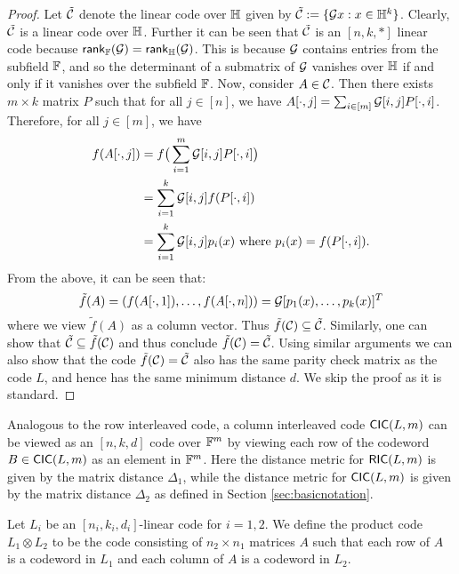 \begin{proof}
Let $\tilde{\mathcal{C}}$ denote the linear code over $\mathbb{H}$ given by $\tilde{\mathcal{C}} :=
\{\mathcal{G}x: x\in \mathbb{H}^k\}$. Clearly, $\tilde{\mathcal{C}}$ is a linear code over $\mathbb{H}$.
Further it can be seen that $\tilde{\mathcal{C}}$ is an $[n,k,\ast]$ linear code because
$\mathsf{rank}_{\mathbb{F}}(\mathcal{G})=\mathsf{rank}_{\mathbb{H}}(\mathcal{G})$. This is because $\mathcal{G}$
contains entries from the subfield $\mathbb{F}$, and so the determinant of a submatrix of $\mathcal{G}$
vanishes over $\mathbb{H}$ if and only if it vanishes over the subfield $\mathbb{F}$. Now,
consider $A\in \mathcal{C}$. Then there exists $m\times k$ matrix $P$ such that for all $j\in [n]$, 
we have $A[\cdot,j]=\sum_{i\in [m]}\mathcal{G}[i,j]P[\cdot,i]$. Therefore, for all
$j\in [m]$,  we have
\begin{align*}
f(A[\cdot,j]) &= f\big(\sum_{i=1}^m \mathcal{G}[i,j]P[\cdot,i]\big) \\
	&= \sum_{i=1}^k \mathcal{G}[i,j]f(P[\cdot,i]) \\
	&= \sum_{i=1}^k \mathcal{G}[i,j]p_i(x) \text{ where } p_i(x)=f(P[\cdot,i]).
\end{align*}
From the above, it can be seen that:
\[ \tilde{f}(A)=(f(A[\cdot,1]),\ldots,f(A[\cdot,n]))=\mathcal{G}
[p_1(x),\ldots,p_k(x)]^T \]
 where we view $\tilde{f}(A)$ as a column vector. Thus
$\tilde{f}(\mathcal{C})\subseteq \tilde{\mathcal{C}}$. Similarly, one can show that
$\tilde{\mathcal{C}}\subseteq \tilde{f}(\mathcal{C})$ and thus conclude
$\tilde{f}(\mathcal{C})=\tilde{\mathcal{C}}$. Using similar arguments we can also show
that the code $\tilde{f}(\mathcal{C})=\tilde{\mathcal{C}}$ also has the same parity check
matrix as the code $L$, and hence has the same minimum distance $d$. We skip the
proof as it is standard. 
\end{proof}

Analogous to the row interleaved code, a column interleaved code $\mathsf{CIC}(L,m)$ 
can be viewed as an $[n,k,d]$ code over $\mathbb{F}^m$ by viewing each row of the
codeword $B\in \mathsf{CIC}(L,m)$ as an element in $\mathbb{F}^m$. Here the distance metric
for $\mathsf{RIC}(L,m)$ is given by the matrix distance $\Delta_1$, while the distance
metric for $\mathsf{CIC}(L,m)$ is given by the matrix distance $\Delta_2$ as defined in
Section \ref{sec:basicnotation}.  
 
\begin{definition}\label{defn:productcode}
Let $L_i$ be an $[n_i,k_i,d_i]$-linear code for $i=1,2$. We define the product
code $L_1\otimes L_2$ to be the code consisting of $n_2\times n_1$ matrices $A$
such that each row of $A$ is a codeword in $L_1$ and each column of $A$ is a
codeword in $L_2$.
\end{definition}

